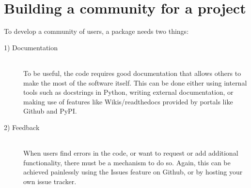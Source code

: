 \documentclass[12pt,a4paper]{article}
\begin{document}
\section*{Building a community for a project}
To develop a community of users, a package needs two things:
\begin{description}
    \item[1) Documentation] \hfill \\
    To be useful, the code requires good documentation that allows others to make the most of the software itself. This can be done either using internal tools such as docstrings in Python, writing external documentation, or making use of features like Wikis/readthedocs provided by portals like Github and PyPI.
    \item[2) Feedback] \hfill \\
    When users find errors in the code, or want to request or add additional functionality, there must be a mechanism to do so. Again, this can be achieved painlessly using the Issues feature on Github, or by hosting your own issue tracker. 
\end{description}
\end{document}
